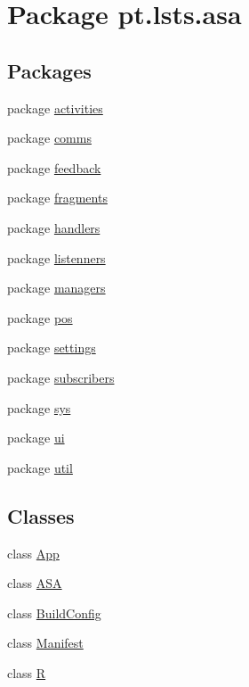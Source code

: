 \hypertarget{namespacept_1_1lsts_1_1asa}{}\section{Package pt.\+lsts.\+asa}
\label{namespacept_1_1lsts_1_1asa}
\subsection*{Packages}
\begin{DoxyCompactItemize}
\item 
package \hyperlink{namespacept_1_1lsts_1_1asa_1_1activities}{activities}
\item 
package \hyperlink{namespacept_1_1lsts_1_1asa_1_1comms}{comms}
\item 
package \hyperlink{namespacept_1_1lsts_1_1asa_1_1feedback}{feedback}
\item 
package \hyperlink{namespacept_1_1lsts_1_1asa_1_1fragments}{fragments}
\item 
package \hyperlink{namespacept_1_1lsts_1_1asa_1_1handlers}{handlers}
\item 
package \hyperlink{namespacept_1_1lsts_1_1asa_1_1listenners}{listenners}
\item 
package \hyperlink{namespacept_1_1lsts_1_1asa_1_1managers}{managers}
\item 
package \hyperlink{namespacept_1_1lsts_1_1asa_1_1pos}{pos}
\item 
package \hyperlink{namespacept_1_1lsts_1_1asa_1_1settings}{settings}
\item 
package \hyperlink{namespacept_1_1lsts_1_1asa_1_1subscribers}{subscribers}
\item 
package \hyperlink{namespacept_1_1lsts_1_1asa_1_1sys}{sys}
\item 
package \hyperlink{namespacept_1_1lsts_1_1asa_1_1ui}{ui}
\item 
package \hyperlink{namespacept_1_1lsts_1_1asa_1_1util}{util}
\end{DoxyCompactItemize}
\subsection*{Classes}
\begin{DoxyCompactItemize}
\item 
class \hyperlink{classpt_1_1lsts_1_1asa_1_1App}{App}
\item 
class \hyperlink{classpt_1_1lsts_1_1asa_1_1ASA}{A\+S\+A}
\item 
class \hyperlink{classpt_1_1lsts_1_1asa_1_1BuildConfig}{Build\+Config}
\item 
class \hyperlink{classpt_1_1lsts_1_1asa_1_1Manifest}{Manifest}
\item 
class \hyperlink{classpt_1_1lsts_1_1asa_1_1R}{R}
\end{DoxyCompactItemize}
